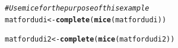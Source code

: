 \documentclass[12pt]{article}\usepackage[]{graphicx}\usepackage[]{color}
\makeatletter
\newcommand{\hlcom}[1]{\textcolor[rgb]{0.678,0.584,0.686}{\textit{#1}}}%
\newcommand{\hlstd}[1]{\textcolor[rgb]{0.345,0.345,0.345}{#1}}%
\newcommand{\hlkwb}[1]{\textcolor[rgb]{0.69,0.353,0.396}{#1}}%
\newcommand{\hlkwd}[1]{\textcolor[rgb]{0.737,0.353,0.396}{\textbf{#1}}}%
\newenvironment{kframe}{%
 \def\at@end@of@kframe{}%
 \ifinner\ifhmode%
  \def\at@end@of@kframe{\end{minipage}}%
  \begin{minipage}{\columnwidth}%
 \fi\fi%
 \def\FrameCommand##1{\hskip\@totalleftmargin \hskip-\fboxsep
 \colorbox{shadecolor}{##1}\hskip-\fboxsep
     \hskip-\linewidth \hskip-\@totalleftmargin \hskip\columnwidth}%
 \MakeFramed {\advance\hsize-\width
   \@totalleftmargin\z@ \linewidth\hsize
   \@setminipage}}%
 {\par\unskip\endMakeFramed%
 \at@end@of@kframe}
\newenvironment{knitrout}{}{} %
\makeatother
\begin{document}
\begin{knitrout}
\color{fgcolor}\begin{kframe}
\begin{alltt}
\hlcom{#Use mice for the purpose of this example}
\hlstd{matfordudi}\hlkwb{<-}\hlkwd{complete}\hlstd{(}\hlkwd{mice}\hlstd{(matfordudi))}
\end{alltt}


{\ttfamily\noindent\bfseries\color{errorcolor}{\#\# Error: objet 'matfordudi' introuvable}}\begin{alltt}
\hlstd{matfordudi2}\hlkwb{<-}\hlkwd{complete}\hlstd{(}\hlkwd{mice}\hlstd{(matfordudi2))}
\end{alltt}


{\ttfamily\noindent\bfseries\color{errorcolor}{\#\# Error: objet 'matfordudi2' introuvable}}\end{kframe}
\end{knitrout}
\end{document}
